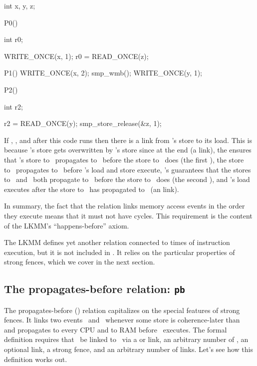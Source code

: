 \begin{VerbatimU}
	int x, y, z;

	P0()
	{
		int r0;

		WRITE_ONCE(x, 1);
		r0 = READ_ONCE(z);
	}

	P1()
	{
		WRITE_ONCE(x, 2);
		smp_wmb();
		WRITE_ONCE(y, 1);
	}

	P2()
	{
		int r2;

		r2 = READ_ONCE(y);
		smp_store_release(&z, 1);
	}
\end{VerbatimU}

If , , and  after this code runs
then there is a  link from 's store to its load.
This is because 's store gets overwritten by 's store
since  at the end (a  link), the 
ensures that 's store to~ propagates to~ before the
store to~ does (the first ), the store to~
propagates to~ before 's load and store execute,
's  guarantees that the stores to~
and~ both propagate to~ before the store to~ does
(the second ), and 's load executes after the
store to~ has propagated to~ (an  link).

In summary, the fact that the  relation links memory access events
in the order they execute means that it must not have cycles.
This requirement is the content of the LKMM's ``happens-before'' axiom.

The LKMM defines yet another relation connected to times of
instruction execution, but it is not included in .
It relies on the particular properties of strong fences, which we
cover in the next section.


\subsection{The propagates-before relation: \texttt{pb}}
\label{sec:docs:explanation:The propagates-before relation: pb}

The propagates-before () relation capitalizes on the special
features of strong fences.
It links two events~ and~ whenever some store is
coherence-later than~ and propagates to every CPU and to RAM
before ~executes.
The formal definition requires that ~be linked to~
via a  or  link, an arbitrary number of
, an optional  link, a strong fence, and
an arbitrary number of  links.
Let's see how this definition works out.

